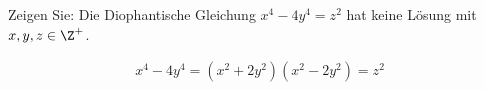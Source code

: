 
\begin{exercise}

Zeigen Sie: Die Diophantische Gleichung $x^4 - 4y^4 = z^2$ hat keine Lösung
mit $x,y,z \in \Z^+$.

\end{exercise}


\begin{solution}

\begin{align*}
    x^4 - 4y^4 = (x^2 + 2y^2)(x^2 - 2y^2) = z^2
\end{align*}

\end{solution}

